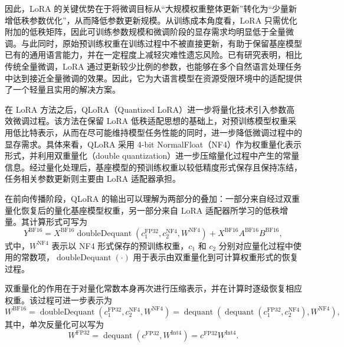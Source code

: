 因此，LoRA 的关键优势在于将微调目标从“大规模权重整体更新”转化为“少量新增低秩参数优化”，从而降低参数更新规模。从训练成本角度看，LoRA 只需优化附加的低秩矩阵，因此可训练参数规模和微调阶段的显存需求均明显低于全量微调。与此同时，原始预训练权重在训练过程中不被直接更新，有助于保留基座模型已有的通用语言能力，并在一定程度上减轻灾难性遗忘风险。已有研究表明，相比传统全量微调，LoRA 通过更新较少比例的参数，也能够在多个自然语言处理任务中达到接近全量微调的效果\cite{Hu2022LoRA}。因此，它为大语言模型在资源受限环境中的适配提供了一个轻量且实用的解决方案。

在 LoRA 方法之后，QLoRA（Quantized LoRA）进一步将量化技术引入参数高效微调过程。该方法在保留 LoRA 低秩适配思想的基础上，对预训练模型权重采用低比特表示，从而在尽可能维持模型任务性能的同时，进一步降低微调过程中的显存需求\cite{Dettmers2023QLoRA}。具体来看，QLoRA 采用 4-bit NormalFloat（NF4）作为权重量化表示形式，并利用双重量化（double quantization）进一步压缩量化过程中产生的常量信息。经过量化处理后，基座模型的预训练权重以较低精度形式保存且保持冻结，任务相关参数更新则主要由 LoRA 适配器承担。

在前向传播阶段，QLoRA 的输出可以理解为两部分的叠加：一部分来自经过双重量化恢复后的量化基座模型权重，另一部分来自 LoRA 适配器所学习的低秩增量。其计算形式可写为
\begin{equation}
Y^{\mathrm{BF16}}
=
X^{\mathrm{BF16}}
\operatorname{doubleDequant}
\left(
c_1^{\mathrm{FP32}},
c_2^{\mathrm{NF4}},
W^{\mathrm{NF4}}
\right)
+
X^{\mathrm{BF16}}A^{\mathrm{BF16}}B^{\mathrm{BF16}},
\label{eq:qlora_forward}
\end{equation}
式中，$W^{\mathrm{NF4}}$ 表示以 NF4 形式保存的预训练权重，$c_1$ 和 $c_2$ 分别对应量化过程中使用的常数项，$\operatorname{doubleDequant}(\cdot)$ 用于表示由双重量化到可计算权重形式的恢复过程。

双重量化的作用在于对量化常数本身再次进行压缩表示，并在计算时逐级恢复相应权重。该过程可进一步表示为
\begin{equation}
W^{\mathrm{BF16}}
=
\operatorname{doubleDequant}
\left(
c_1^{\mathrm{FP32}},
c_2^{\mathrm{NF4}},
W^{\mathrm{NF4}}
\right)
=
\operatorname{dequant}
\left(
\operatorname{dequant}
\left(
c_1^{\mathrm{FP32}},
c_2^{\mathrm{NF4}}
\right),
W^{\mathrm{NF4}}
\right),
\label{eq:double_dequant}
\end{equation}
其中，单次反量化可以写为
\begin{equation}
W^{\mathrm{FP32}}
=
\operatorname{dequant}(c^{\mathrm{FP32}}, W^{\mathrm{Int4}})
=
c^{\mathrm{FP32}} W^{\mathrm{Int4}} .
\label{eq:dequant}
\end{equation}


